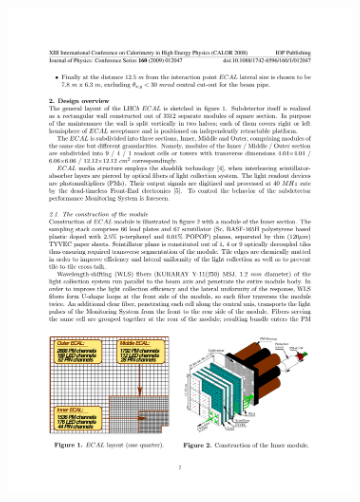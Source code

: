 \begin{figure}[!h]
    \centering
    \begin{subfigure}[t]{0.4\textwidth}
        \centering        
        \includegraphics[width=1.0\textwidth]{figs/Detector/ecal_diagram.pdf}
    \end{subfigure}
    \begin{subfigure}[t]{0.4\textwidth}
        \centering

\end{subfigure}
\end{figure}
